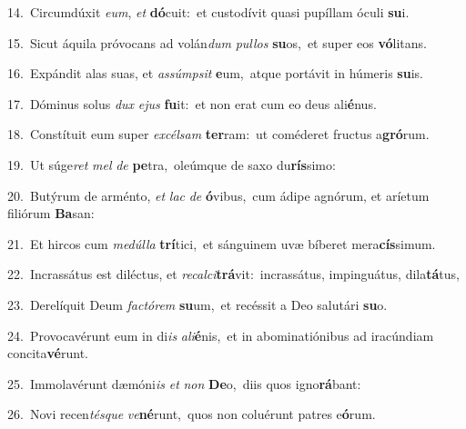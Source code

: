 {\numbfont\textcolor{\numbcolor}{14.}}~Circumdúxit \textit{e}\-\textit{um}, \textit{et} \textbf{dó}\-cuit:~\star et custodívit quasi pupíllam óculi \textbf{su}\-i.\par
{\numbfont\textcolor{\numbcolor}{15.}}~Sicut áquila próvocans ad volán\textit{dum} \textit{pul}\-\textit{los} \textbf{su}\-os,~\star et super eos \textbf{vó}\-litans.\par
{\numbfont\textcolor{\numbcolor}{16.}}~Expándit alas suas, et \textit{as}\-\textit{súmp}\textit{sit} \textbf{e}\-um,~\star atque portávit in húmeris \textbf{su}\-is.\par
{\numbfont\textcolor{\numbcolor}{17.}}~Dóminus solus \textit{dux} \textit{e}\-\textit{jus} \textbf{fu}\-it:~\star et non erat cum eo deus ali\-\textbf{é}\-nus.\par
{\numbfont\textcolor{\numbcolor}{18.}}~Constítuit eum super \textit{ex}\-\textit{cél}\textit{sam} \textbf{ter}\-ram:~\star ut coméderet fructus a\-\textbf{gró}\-rum.\par
{\numbfont\textcolor{\numbcolor}{19.}}~Ut súge\textit{ret} \textit{mel} \textit{de} \textbf{pe}\-tra,~\star oleúmque de saxo du\-\textbf{rís}\-simo:\par
{\numbfont\textcolor{\numbcolor}{20.}}~Butýrum de arménto, \textit{et} \textit{lac} \textit{de} \textbf{ó}\-vibus,~\star cum ádipe agnórum, et aríetum filiórum \textbf{Ba}\-san:\par
{\numbfont\textcolor{\numbcolor}{21.}}~Et hircos cum \textit{me}\-\textit{dúl}\textit{la} \textbf{trí}\-tici,~\star et sánguinem uvæ bíberet mera\-\textbf{cís}\-simum.\par
{\numbfont\textcolor{\numbcolor}{22.}}~Incrassátus est diléctus, et \textit{re}\-\textit{cal}\textit{ci}\textbf{trá}vit:~\star incrassátus, impinguátus, dila\-\textbf{tá}\-tus,\par
{\numbfont\textcolor{\numbcolor}{23.}}~Derelíquit Deum \textit{fac}\-\textit{tó}\textit{rem} \textbf{su}\-um,~\star et recéssit a Deo salutári \textbf{su}\-o.\par
{\numbfont\textcolor{\numbcolor}{24.}}~Provocavérunt eum in di\textit{is} \textit{a}\-\textit{li}\textbf{é}nis,~\star et in abominatiónibus ad iracúndiam concita\-\textbf{vé}\-runt.\par
{\numbfont\textcolor{\numbcolor}{25.}}~Immolavérunt dæmóni\textit{is} \textit{et} \textit{non} \textbf{De}\-o,~\star diis quos igno\-\textbf{rá}\-bant:\par
{\numbfont\textcolor{\numbcolor}{26.}}~Novi recen\-\textit{tés}\-\textit{que} \textit{ve}\-\textbf{né}runt,~\star quos non coluérunt patres e\-\textbf{ó}\-rum.\par
